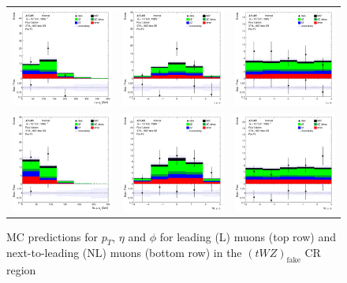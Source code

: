 \begin{figure}[htbp]
    \centering
  \begin{tabular}{ccc}



    \includegraphics[width=.2\textwidth]{figures/PreFitPlots/lep4_tWZ_3T1L_L_mu_pt} &
    \includegraphics[width=.2\textwidth]{figures/PreFitPlots/lep4_tWZ_3T1L_L_mu_eta} &
    \includegraphics[width=.2\textwidth]{figures/PreFitPlots/lep4_tWZ_3T1L_L_mu_phi} \\
    \includegraphics[width=.2\textwidth]{figures/PreFitPlots/lep4_tWZ_3T1L_NL_mu_pt} &
    \includegraphics[width=.2\textwidth]{figures/PreFitPlots/lep4_tWZ_3T1L_NL_mu_eta} &
    \includegraphics[width=.2\textwidth]{figures/PreFitPlots/lep4_tWZ_3T1L_NL_mu_phi} \\

  \end{tabular}
    \caption{MC predictions for $p_{T}$, $\eta$ and $\phi$ for leading (L) muons (top row) and next-to-leading (NL) muons (bottom row) in the $(tWZ)_{\text{fake}}$ CR region }
\end{figure}


